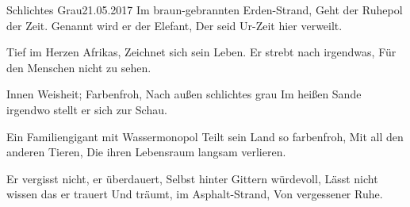 \begin{poem}{Schlichtes Grau}{21.05.2017}
Im braun-gebrannten Erden-Strand,
Geht der Ruhepol der Zeit.
Genannt wird er der Elefant,
Der seid Ur-Zeit hier verweilt.

Tief im Herzen Afrikas,
Zeichnet sich sein Leben.
Er strebt nach irgendwas,
Für den Menschen nicht zu sehen.

Innen Weisheit; Farbenfroh,
Nach außen schlichtes grau
Im heißen Sande irgendwo
stellt er sich zur Schau.

Ein Familiengigant mit Wassermonopol
Teilt sein Land so farbenfroh,
Mit all den anderen Tieren,
Die ihren Lebensraum langsam verlieren.

Er vergisst nicht, er überdauert,
Selbst hinter Gittern würdevoll,
Lässt nicht wissen das er trauert
Und träumt, im Asphalt-Strand,
Von vergessener Ruhe.
\end{poem}